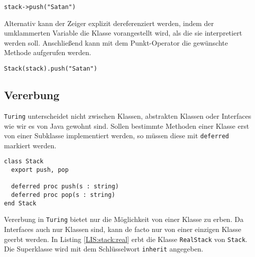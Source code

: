 \lstset{label=LIS:stack call}
\begin{table}[h!]
\begin{lstlisting}
stack->push("Satan")
\end{lstlisting}
\end{table}

Alternativ kann der Zeiger explizit dereferenziert werden, indem der umklammerten Variable die Klasse vorangestellt wird, als die sie interpretiert werden soll. Anschlie\ss{}end kann mit dem Punkt-Operator die gew\"unschte Methode aufgerufen werden. 

\lstset{label=LIS:stack call2}
\begin{table}[h!]
\begin{lstlisting}
Stack(stack).push("Satan") 
\end{lstlisting}
\end{table}

\subsection{Vererbung}

\texttt{Turing} unterscheidet nicht zwischen Klassen, abstrakten Klassen oder Interfaces wie wir es von Java gewohnt sind. Sollen bestimmte Methoden einer Klasse erst von einer Subklasse implementiert werden, so m\"ussen diese mit \lstinline{deferred} markiert werden. 

\lstset{label=LIS:stack class}
\begin{table}[h!]
\begin{lstlisting}
class Stack
  export push, pop
  
  deferred proc push(s : string)
  deferred proc pop(s : string)
end Stack
\end{lstlisting}
\end{table}

Vererbung in \texttt{Turing} bietet nur die M\"oglichkeit von einer Klasse zu erben. Da Interfaces auch nur Klassen sind, kann de facto nur von einer einzigen Klasse geerbt werden. In Listing \ref{LIS:stack:real} erbt die Klasse \lstinline{RealStack} von \lstinline{Stack}. Die Superklasse wird mit dem Schl\"usselwort \lstinline{inherit} angegeben.

